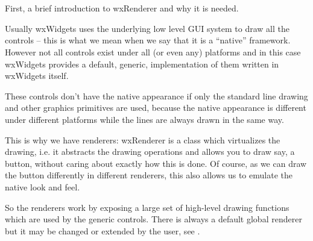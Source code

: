 
\section{}\label{wxrenderernative}

First, a brief introduction to wxRenderer and why it is needed.

Usually wxWidgets uses the underlying low level GUI system to draw all the
controls -- this is what we mean when we say that it is a ``native'' framework.
However not all controls exist under all (or even any) platforms and in this
case wxWidgets provides a default, generic, implementation of them written in
wxWidgets itself.

These controls don't have the native appearance if only the standard
line drawing and other graphics primitives are used, because the native
appearance is different under different platforms while the lines are always
drawn in the same way.

This is why we have renderers: wxRenderer is a class which virtualizes the
drawing, i.e. it abstracts the drawing operations and allows you to draw say, a
button, without caring about exactly how this is done. Of course, as we
can draw the button differently in different renderers, this also allows us to
emulate the native look and feel.

So the renderers work by exposing a large set of high-level drawing functions
which are used by the generic controls. There is always a default global
renderer but it may be changed or extended by the user, see 
.

